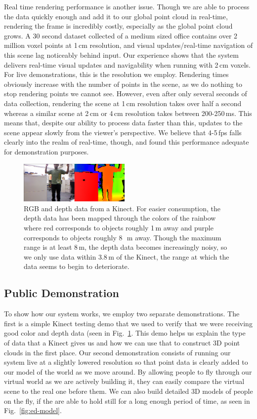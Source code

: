 \documentclass[letterpaper, 10pt, conference]{ieeeconf}
\begin{document}
Real time rendering performance is another issue. Though we are able to
process the data quickly enough and add it to our global point cloud in
real-time, rendering the frame is incredibly costly, especially as the global
point cloud grows. A 30 second dataset collected of a medium sized office
contains over 2 million voxel points at 1\,cm resolution, and visual
updates/real-time navigation of this scene lag noticeably behind input. Our
experience shows that the system delivers real-time visual updates and
navigability when running with 2\,cm voxels. For live demonstrations, this is
the resolution we employ. Rendering times obviously increase with the number
of points in the scene, as we do nothing to stop rendering points we cannot
see. However, even after only several seconds of data collection, rendering
the scene at 1\,cm resolution takes over half a second whereas a similar scene
at 2\,cm or 4\,cm resolution takes between 200-250\,ms. This means that,
despite our ability to process data faster than this, updates to the scene
appear slowly from the viewer's perspective. We believe that 4-5\,fps falls
clearly into the realm of real-time, though, and found this performance
adequate for demonstration purposes.

\begin{figure}
\centering
\includegraphics[width=0.48\textwidth]{figures/KinectDemo.png}
\caption{RGB and depth data from a Kinect. For easier consumption, the depth
data has been mapped through the colors of the rainbow where red corresponds
to objects roughly 1\,m away and purple corresponds to objects roughly 8~\,m
away. Though the maximum range is at least 8\,m, the depth data
becomes increasingly noisy, so we only use data within 3.8\,m of the Kinect,
the range at which the data seems to begin to deteriorate.}
\label{fig:kinect-demo}
\end{figure}

\subsection{Public Demonstration}
To show how our system works, we employ two separate demonstrations. The first
is a simple Kinect testing demo that we used to verify that we were receiving
good color and depth data (seen in Fig.~\ref{fig:kinect-demo}. This demo helps
us explain the type of data that a Kinect gives us and how we can use that to
construct 3D point clouds in the first place. Our second demonstration
consists of running our system live at a slightly lowered resolution so that
point data is clearly added to our model of the world as we move around. By
allowing people to fly through our virtual world as we are actively building
it, they can easily compare the virtual scene to the real one before them. We
can also build detailed 3D models of people on the fly, if the are able to
hold still for a long enough period of time, as seen in Fig.~\ref{fig:ed-model}.
\end{document}

